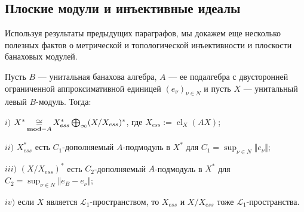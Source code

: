 
\subsection{Плоские модули и инъективные идеалы}
\label{SubSectionFlatModulesAndInjectiveIdeals}

Используя результаты предыдущих параграфов, мы докажем еще несколько полезных фактов о метрической и топологической инъективности и плоскости банаховых модулей.

\begin{proposition}\label{DualBanModDecomp} Пусть $B$ --- унитальная банахова алгебра, $A$ --- ее подалгебра с двусторонней ограниченной аппроксимативной единицей $(e_\nu)_{\nu\in N}$ и пусть $X$ --- унитальный левый $B$-модуль. Тогда:

$i)$ $X^*\mathop{\mathbin{\cong}}\limits_{\mathbf{mod}-A}X_{ess}^*\bigoplus_\infty (X/X_{ess})^*$, где $X_{ess}:=\operatorname{cl}_X(AX)$;

$ii)$ $X_{ess}^*$ есть $C_1$-дополняемый $A$-подмодуль в $X^*$ для $C_1=\sup_{\nu\in N}\Vert e_\nu\Vert$;

$iii)$ $(X/X_{ess})^*$ есть $C_2$-дополняемый $A$-подмодуль в $X^*$ для $C_2=\sup_{\nu\in N}\Vert e_B - e_\nu\Vert$;

$iv)$ если $X$ является $\mathscr{L}_1$-пространством, то $X_{ess}$ и $X/X_{ess}$ тоже $\mathscr{L}_1$-пространства.
\end{proposition}
